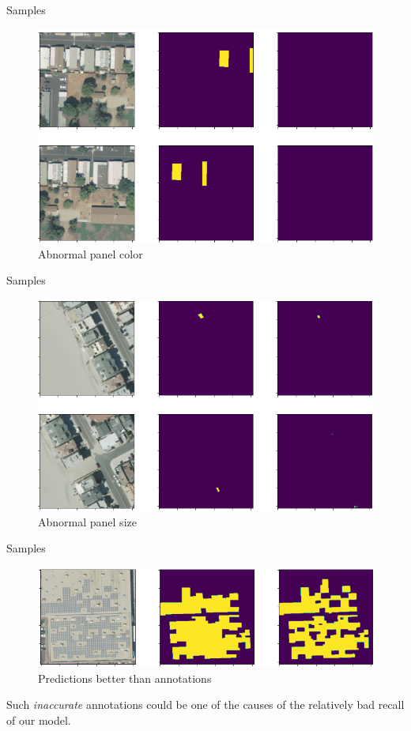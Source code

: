 \documentclass[12pt]{beamer}
\begin{document}
\begin{frame}{Samples}
    \begin{figure}
        \centering
        \includegraphics[width=\textwidth]{resources/png/bad_color_crop.png}
        \caption{Abnormal panel color}
    \end{figure}
\end{frame}

\begin{frame}{Samples}
    \begin{figure}
        \centering
        \includegraphics[width=\textwidth]{resources/png/bad_size_crop.png}
        \caption{Abnormal panel size}
    \end{figure}
\end{frame}

\begin{frame}{Samples}
    \begin{figure}
        \centering
        \includegraphics[width=\textwidth]{resources/png/beter_than_annotation_crop.png}
        \caption{Predictions better than annotations}
    \end{figure}
    Such \emph{inaccurate} annotations could be one of the causes of the relatively bad \alert{recall} of our model.
\end{frame}
\end{document}
